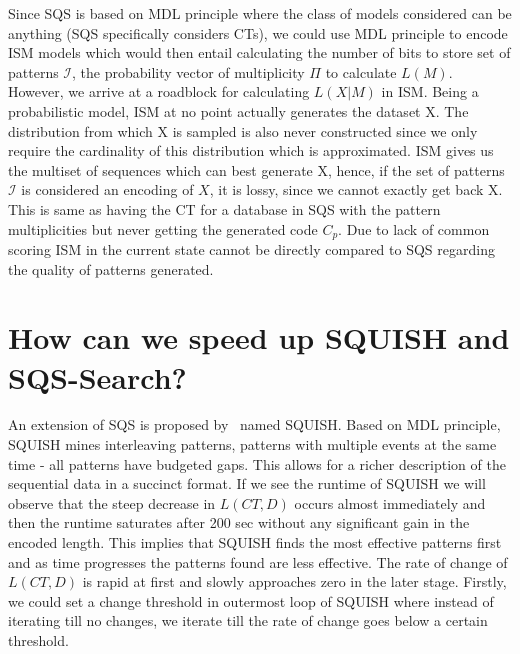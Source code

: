 \documentclass[10pt]{article}
\begin{document}
\par Since SQS is based on MDL principle where the class of models considered can be anything (SQS specifically considers CTs), we could use MDL principle to encode ISM models which would then entail calculating the number of bits to store set of patterns $\mathcal{I}$, the probability vector of multiplicity $\Pi$ to calculate $L(M)$. However, we arrive at a roadblock for calculating $L(X|M)$ in ISM. Being a probabilistic model, ISM at no point actually generates the dataset X. The distribution from which X is sampled is also never constructed since we only require the cardinality of this distribution which is approximated. ISM gives us the multiset of sequences which can best generate X, hence, if the set of patterns $\mathcal{I}$ is considered an encoding of $X$, it is lossy, since we cannot exactly get back X. This is same as having the CT for a database in SQS with the pattern multiplicities but never getting the generated code $C_p$. Due to lack of common scoring ISM in the current state cannot be directly compared to SQS regarding the quality of patterns generated.
  
%

\section{How can we speed up SQUISH and SQS-Search?}
\par An extension of SQS is proposed by~\citet{bhattacharyya2017efficiently} named SQUISH. Based on MDL principle, SQUISH mines interleaving patterns, patterns with multiple events at the same time - all patterns have budgeted gaps. This allows for a richer description of the sequential data in a succinct format. If we see the runtime of SQUISH we will observe that the steep decrease in $L(CT,D)$ occurs almost immediately and then the runtime saturates after 200 sec without any significant gain in the encoded length. This implies that SQUISH finds the most effective patterns first and as time progresses the patterns found are less effective. The rate of change of $L(CT,D)$ is rapid at first and slowly approaches zero in the later stage. Firstly, we could set a change threshold in outermost loop of SQUISH where instead of iterating till no changes, we iterate till the rate of change goes below a certain threshold. 
\end{document}
